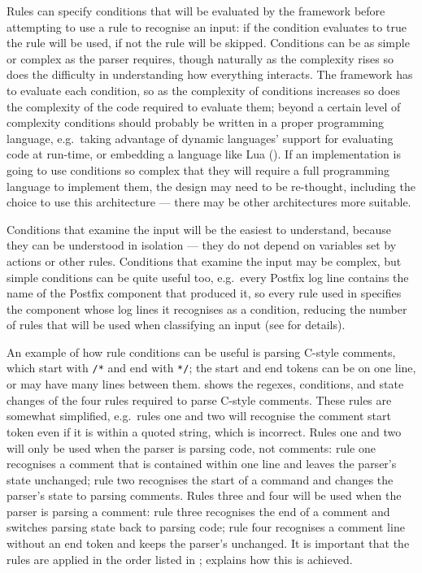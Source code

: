Rules can specify conditions that will be evaluated by the framework before
attempting to use a rule to recognise an input: if the condition evaluates
to true the rule will be used, if not the rule will be skipped.  Conditions
can be as simple or complex as the parser requires, though naturally as the
complexity rises so does the difficulty in understanding how everything
interacts.  The framework has to evaluate each condition, so as the
complexity of conditions increases so does the complexity of the code
required to evaluate them; beyond a certain level of complexity conditions
should probably be written in a proper programming language, e.g.\ taking
advantage of dynamic languages' support for evaluating code at run-time, or
embedding a language like Lua
().  If an
implementation is going to use conditions so complex that they will require
a full programming language to implement them, the design may need to be
re-thought, including the choice to use this architecture --- there may be
other architectures more suitable.

Conditions that examine the input will be the easiest to understand,
because they can be understood in isolation --- they do not depend on
variables set by actions or other rules.  Conditions that examine the input
may be complex, but simple conditions can be quite useful too, e.g.\ every
Postfix log \empty{}line contains the name of the Postfix component that
produced it, so every rule used in \parsername{} specifies the component
whose log \empty{}lines it recognises as a condition, reducing the number
of rules that will be used when classifying an input (see  for details).

An example of how rule conditions can be useful is parsing C-style
comments, which start with \texttt{/*} and end with \texttt{*/}; the start
and end tokens can be on one line, or may have many lines between them.
 shows the regexes, conditions,
and state changes of the four rules required to parse C-style comments.
These rules are somewhat simplified, e.g.\ rules one and two will recognise
the comment start token even if it is within a quoted string, which is
incorrect.  Rules one and two will only be used when the parser is parsing
code, not comments: rule one recognises a comment that is contained within
one line and leaves the parser's state unchanged; rule two recognises the
start of a command and changes the parser's state to parsing comments.
Rules three and four will be used when the parser is parsing a comment:
rule three recognises the end of a comment and switches parsing state back
to parsing code; rule four recognises a comment line without an end token
and keeps the parser's unchanged.  It is important that the rules are
applied in the order listed in ;
 explains how this is
achieved.

